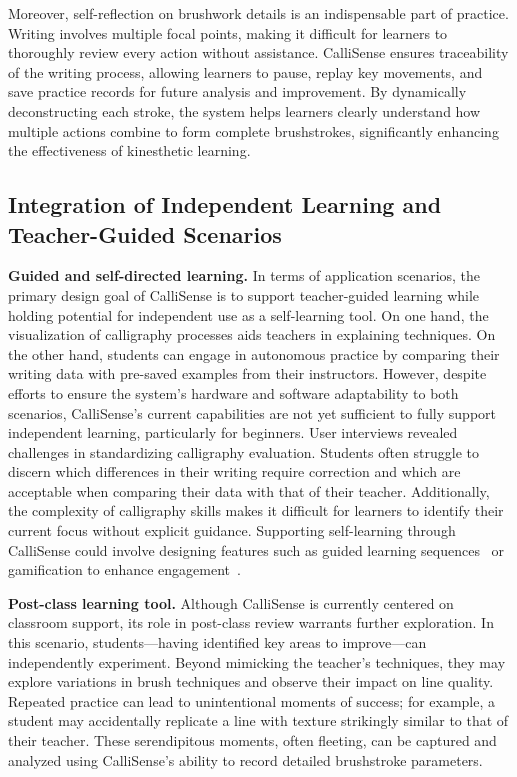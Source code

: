 Moreover, self-reflection on brushwork details is an indispensable part of practice. Writing involves multiple focal points, making it difficult for learners to thoroughly review every action without assistance. CalliSense ensures traceability of the writing process, allowing learners to pause, replay key movements, and save practice records for future analysis and improvement. By dynamically deconstructing each stroke, the system helps learners clearly understand how multiple actions combine to form complete brushstrokes, significantly enhancing the effectiveness of kinesthetic learning.



\subsection{Integration of Independent Learning and Teacher-Guided Scenarios}
\textbf{Guided and self-directed learning.} In terms of application scenarios, the primary design goal of CalliSense is to support teacher-guided learning while holding potential for independent use as a self-learning tool. On one hand, the visualization of calligraphy processes aids teachers in explaining techniques. On the other hand, students can engage in autonomous practice by comparing their writing data with pre-saved examples from their instructors. However, despite efforts to ensure the system's hardware and software adaptability to both scenarios, CalliSense's current capabilities are not yet sufficient to fully support independent learning, particularly for beginners.
User interviews revealed challenges in standardizing calligraphy evaluation. Students often struggle to discern which differences in their writing require correction and which are acceptable when comparing their data with that of their teacher. Additionally, the complexity of calligraphy skills makes it difficult for learners to identify their current focus without explicit guidance. Supporting self-learning through CalliSense could involve designing features such as guided learning sequences~\cite{brydges2010comparing, duschl2011learning} or gamification to enhance engagement~\cite{suh2018enhancing, mohamad2018gamification}.

\textbf{Post-class learning tool.} Although CalliSense is currently centered on classroom support, its role in post-class review warrants further exploration. In this scenario, students—having identified key areas to improve—can independently experiment. Beyond mimicking the teacher’s techniques, they may explore variations in brush techniques and observe their impact on line quality. Repeated practice can lead to unintentional moments of success; for example, a student may accidentally replicate a line with texture strikingly similar to that of their teacher. These serendipitous moments, often fleeting, can be captured and analyzed using CalliSense’s ability to record detailed brushstroke parameters.

